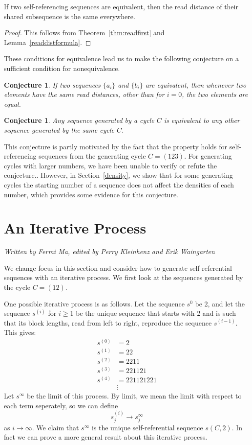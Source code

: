 \documentclass[runningheads,a4paper]{llncs}
\newtheorem{conj}[theorem]{Conjecture}
\begin{document}
\begin{corollary}
If two self-referencing sequences are equivalent, then the read distance of their shared subsequence is the same everywhere.
\end{corollary}

\begin{proof}
This follows from Theorem~\ref{thm:readfirst} and Lemma~\ref{readdistformula}.
\end{proof}

These conditions for equivalence lead us to make the following conjecture on a sufficient condition for nonequivalence.

\begin{conj} If two sequences $\{a_i\}$ and $\{b_i\}$ are equivalent, then whenever two elements have the same read distances, other than for $i=0$,  the two elements are equal. 
\end{conj}


\begin{conj} Any sequence generated by a cycle $C$ is equivalent to any other sequence generated by the same cycle $C$.
\end{conj}

This conjecture is partly motivated by the fact that the property holds for self-referencing sequences from the generating cycle $C= (123)$. For generating cycles with larger numbers, we have been unable to verify or refute the conjecture.. However, in Section~\ref{density}, we show that for some generating cycles the starting number of a sequence does not affect the densities of each number, which provides some evidence for this conjecture.

\section{An Iterative Process}
\label{iterativeprocess}

\emph{Written by Fermi Ma, edited by Perry Kleinhenz and Erik Waingarten}

We change focus in this section and consider how to generate self-referential sequences with an iterative process. We first look at the sequences generated by the cycle $C = (1 2)$.

One possible iterative process is as follows. Let the sequence $s^0$ be 2, and let the sequence $s^{(i)}$ for $i \geq 1$ be the unique sequence that starts with 2 and is such that its block lengths, read from left to right, reproduce the sequence $s^{(i-1)}$. This gives:
\begin{align*}
s^{(0)}&= 2\\
s^{(1)} &= 22\\
s^{(2)} &= 2211\\
s^{(3)}&= 221121\\
s^{(4)} &= 221121221\\
&\vdots
\end{align*}
Let $s^\infty$ be the limit of this process. 
By limit, we mean the limit with respect to each term seperately, so we can define
\[ s^{(i)}_j \rightarrow s^\infty_j \]
as $i \rightarrow \infty$. We claim that $s^\infty$ is the unique self-referential sequence $s(C,2)$. In fact we can prove a more general result about this iterative process.
\end{document}
